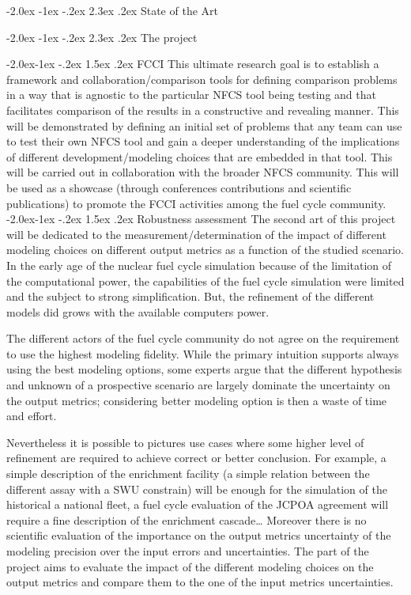 \documentclass[dvips,11pt]{article}
\makeatletter
\renewcommand\section{\@startsection {section}{1}{\z@}%
                                   {-2.0ex \@plus -1ex \@minus -.2ex}%
                                   {2.3ex \@plus.2ex}%
                                   {\normalfont\bfseries}}%
\renewcommand\subsection{\@startsection{subsection}{2}{\z@}%
                                     {-2.0ex\@plus -1ex \@minus -.2ex}%
                                     {1.5ex \@plus .2ex}%
                                     {\normalfont\bfseries}}%
\makeatother
\begin{document}
\section{State of the Art}

\section{The project}

\subsection{FCCI}
This ultimate research goal is to establish a framework and
collaboration/comparison tools for defining comparison problems in a way that is
agnostic to the particular NFCS tool being testing and that facilitates
comparison of the results in a constructive and revealing manner.  This will be
demonstrated by defining an initial set of problems that any team can use to
test their own NFCS tool and gain a deeper understanding of the implications of
different development/modeling choices that are embedded in that tool. This will
be carried out in collaboration with the broader NFCS community. This will be
used as a showcase (through conferences contributions and scientific
publications) to promote the FCCI activities among the fuel cycle community. 
\subsection{Robustness assessment}
The second art of this project will be dedicated to the
measurement/determination of the impact of different modeling choices on
different output metrics as a function of the studied scenario.  In the early
age of the nuclear fuel cycle simulation because of the limitation of the
computational power, the capabilities of the fuel cycle simulation were limited
and the subject to strong simplification. But, the refinement of the different
models did grows with the available computers power. 

The different actors of the fuel cycle community do not agree on the requirement
to use the highest modeling fidelity. While the primary intuition supports
always using the best modeling options, some experts argue that the different
hypothesis and unknown of a prospective scenario are largely dominate the
uncertainty on the output metrics; considering better modeling option is then a
waste of time and effort.

Nevertheless it is possible to pictures use cases where some higher level of
refinement are required to achieve correct or better conclusion. For example, a
simple description of the enrichment facility (a simple relation between the
different assay with a SWU constrain) will be enough for the simulation of the
historical a national fleet, a fuel cycle evaluation of the JCPOA agreement will
require a fine description of the enrichment cascade\dots
Moreover there is no scientific evaluation of the importance on the output
metrics uncertainty of the modeling precision over the input errors and
uncertainties.
The part of the project aims to evaluate the impact of the different modeling
choices on the output metrics and compare them to the one of the input metrics
uncertainties.
\end{document}
